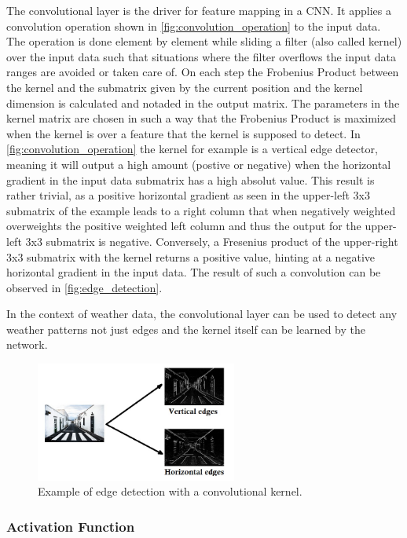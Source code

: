 The convolutional layer is the driver for feature mapping in a CNN. It applies a convolution operation shown in \autoref{fig:convolution_operation} to the input data. The operation is done element by element while sliding a filter (also called kernel) over the input data such that situations where the filter overflows the input data ranges are avoided or taken care of. On each step the Frobenius Product between the kernel and the submatrix given by the current position and the kernel dimension is calculated and notaded in the output matrix. The parameters in the kernel matrix are chosen in such a way that the Frobenius Product is maximized when the kernel is over a feature that the kernel is supposed to detect. In \autoref{fig:convolution_operation} the kernel for example is a vertical edge detector, meaning it will output a high amount (postive or negative) when the horizontal gradient in the input data submatrix has a high absolut value. This result is rather trivial, as a positive horizontal gradient as seen in the upper-left 3x3 submatrix of the example leads to a right column that when negatively weighted overweights the positive weighted left column and thus the output for the upper-left 3x3 submatrix is negative. Conversely, a Fresenius product of the upper-right 3x3 submatrix with the kernel returns a positive value, hinting at a negative horizontal gradient in the input data. The result of such a convolution can be observed in \autoref{fig:edge_detection}.

In the context of weather data, the convolutional layer can be used to detect any weather patterns not just edges and the kernel itself can be learned by the network.

\begin{figure}
    \centering
    \includegraphics[width=250px]{resources/images/edge_detection.jpeg}
    \caption{Example of edge detection with a convolutional kernel. \cite{datahacker}}
    \label{fig:edge_detection}
\end{figure}

\subsubsection*{Activation Function}

